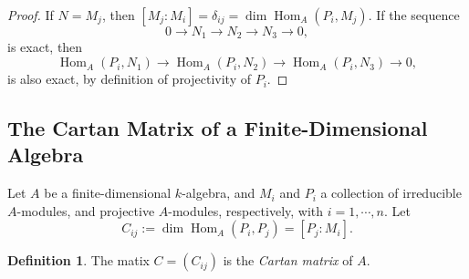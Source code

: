 \documentclass[a4paper]{report}
\theoremstyle{definition}
\newtheorem{definition}{Definition}
\theoremstyle{remark}
\theoremstyle{proposition}
\theoremstyle{conjecture}
\theoremstyle{lemma}
\theoremstyle{corollary}
\theoremstyle{exercise}
\theoremstyle{example}
\newcommand{\on}{\operatorname}
\begin{document}
\begin{proof}
    If $N = M_j$, then $[M_j : M_i] = \delta_{ij} = \dim\on{Hom}_A(P_i,M_j)$.
    If the sequence $$0 \longrightarrow N_1 \longrightarrow N_2 \longrightarrow N_3 \longrightarrow 0,$$
    is exact, then $$\on{Hom}_A(P_i,N_1) \longrightarrow \on{Hom}_A(P_i,N_2)\longrightarrow \on{Hom}_A(P_i,N_3) \longrightarrow 0,$$
    is also exact, by definition of projectivity of $P_i$.
\end{proof}

\subsection{The Cartan Matrix of a Finite-Dimensional Algebra}

Let $A$ be a finite-dimensional $k$-algebra, and $M_i$ and $P_i$ a collection
of irreducible $A$-modules, and projective $A$-modules, respectively, with 
$i=1,\cdots,n$. Let 
$$C_{ij} := \dim\on{Hom}_A(P_i,P_j) = [P_j:M_i].$$

\begin{definition}
    The matix $C = (C_{ij})$ is the \emph{Cartan matrix} of $A$.
\end{definition}
\end{document}
